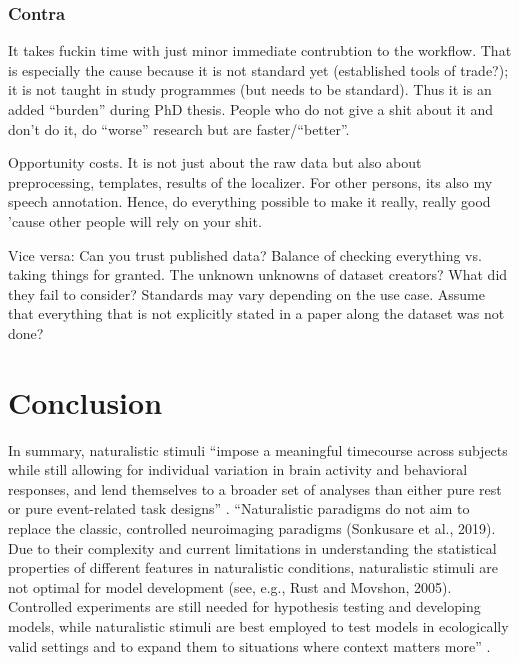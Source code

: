 

\subsubsection{Contra}


%
It takes fuckin time with just minor immediate contrubtion to the workflow.
%
That is especially the cause because it is not standard yet (established tools
of trade?); it is not taught in study programmes (but needs to be standard).
Thus it is an added ``burden'' during PhD thesis.
%
People who do not give a shit about it and don't do it, do ``worse'' research
but are faster/``better''.

%
Opportunity costs. It is not just about the raw data but also about
preprocessing, templates, results of the localizer. For other persons, its also
my speech annotation.
%
Hence, do everything possible to make it really, really good 'cause other people
will rely on your shit.

%
Vice versa: Can you trust published data? Balance of checking everything vs.
taking things for granted.
%
The unknown unknowns of dataset creators? What did they fail to consider?
Standards may vary depending on the use case. Assume that everything that is not
explicitly stated in a paper along the dataset was not done?


\section{Conclusion}
%
In summary, naturalistic stimuli ``impose a meaningful timecourse across
subjects while still allowing for individual variation in brain activity and
behavioral responses, and lend themselves to a broader set of analyses than
either pure rest or pure event-related task designs'' \citep{finn2017can}.
%
``Naturalistic paradigms do not aim to replace the classic, controlled
neuroimaging paradigms (Sonkusare et al., 2019). Due to their complexity and
current limitations in understanding the statistical properties of different
features in naturalistic conditions, naturalistic stimuli are not optimal for
model development (see, e.g., Rust and Movshon, 2005). Controlled experiments
are still needed for hypothesis testing and developing models, while
naturalistic stimuli are best employed to test models in ecologically valid
settings and to expand them to situations where context matters
more'' \citep{saarimaki2021naturalistic}.
